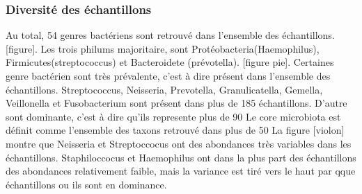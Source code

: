 \documentclass[12pt,a4paper]{article}
\begin{document}
\subsubsection{Diversité des échantillons}

Au total, 54 genres bactériens sont retrouvé dans l’ensemble des échantillons. [figure].
Les trois philums majoritaire, sont Protéobacteria(Haemophilus), Firmicutes(streptococcus) et Bacteroidete (prévotella). [figure pie].
Certaines genre bactérien sont très prévalente, c’est à dire présent dans l’ensemble des échantillons. Streptococcus, Neisseria, Prevotella, Granulicatella, Gemella, Veillonella et Fusobacterium sont présent dans plus de 185 échantillons.
D’autre sont dominante, c’est à dire qu’ils represente plus de 90%
Le core microbiota est définit comme l’ensemble des taxons retrouvé dans plus de 50%
La figure [violon] montre que Neisseria et Streptoccocus ont des abondances très variables dans les échantillons. Staphiloccocus et Haemophilus ont dans la plus part des échantillons des abondances relativement faible, mais la variance est tiré vers le haut par qque échantillons ou ils sont en dominance.
\end{document}
